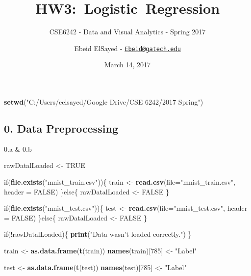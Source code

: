 \documentclass[]{article}
\title{HW3:~Logistic~Regression}
\subtitle{CSE6242 - Data and Visual Analytics - Spring 2017}
\author{Ebeid ElSayed -
\href{mailto:Ebeid@gatech.edu}{\nolinkurl{Ebeid@gatech.edu}}}
\date{March 14, 2017}
\newenvironment{Shaded}{\begin{snugshade}}{\end{snugshade}}
\newcommand{\KeywordTok}[1]{\textcolor[rgb]{0.13,0.29,0.53}{\textbf{{#1}}}}
\newcommand{\DataTypeTok}[1]{\textcolor[rgb]{0.13,0.29,0.53}{{#1}}}
\newcommand{\DecValTok}[1]{\textcolor[rgb]{0.00,0.00,0.81}{{#1}}}
\newcommand{\StringTok}[1]{\textcolor[rgb]{0.31,0.60,0.02}{{#1}}}
\newcommand{\OtherTok}[1]{\textcolor[rgb]{0.56,0.35,0.01}{{#1}}}
\newcommand{\NormalTok}[1]{{#1}}
\begin{document}
\maketitle

\begin{Shaded}
\begin{Highlighting}[]
\KeywordTok{setwd}\NormalTok{(}\StringTok{"C:/Users/eelsayed/Google Drive/CSE 6242/2017 Spring"}\NormalTok{)}
\end{Highlighting}
\end{Shaded}

\subsection{0. Data Preprocessing}\label{data-preprocessing}

0.a \& 0.b

\begin{Shaded}
\begin{Highlighting}[]
\NormalTok{rawDatalLoaded <-}\StringTok{ }\OtherTok{TRUE}

\NormalTok{if(}\KeywordTok{file.exists}\NormalTok{(}\StringTok{"mnist_train.csv"}\NormalTok{))\{}
  \NormalTok{train <-}\StringTok{ }\KeywordTok{read.csv}\NormalTok{(}\DataTypeTok{file=}\StringTok{"mnist_train.csv"}\NormalTok{, }\DataTypeTok{header =} \OtherTok{FALSE}\NormalTok{)}
\NormalTok{\}else\{}
  \NormalTok{rawDatalLoaded <-}\StringTok{ }\OtherTok{FALSE}
\NormalTok{\}}

\NormalTok{if(}\KeywordTok{file.exists}\NormalTok{(}\StringTok{"mnist_test.csv"}\NormalTok{))\{}
  \NormalTok{test <-}\StringTok{ }\KeywordTok{read.csv}\NormalTok{(}\DataTypeTok{file=}\StringTok{"mnist_test.csv"}\NormalTok{, }\DataTypeTok{header =} \OtherTok{FALSE}\NormalTok{)}
\NormalTok{\}else\{}
  \NormalTok{rawDatalLoaded <-}\StringTok{ }\OtherTok{FALSE}
\NormalTok{\}}

\NormalTok{if(!rawDatalLoaded)\{}
  \KeywordTok{print}\NormalTok{(}\StringTok{"Data wasn't loaded correctly."}\NormalTok{)}
\NormalTok{\}}

\NormalTok{train <-}\StringTok{ }\KeywordTok{as.data.frame}\NormalTok{(}\KeywordTok{t}\NormalTok{(train))}
\KeywordTok{names}\NormalTok{(train)[}\DecValTok{785}\NormalTok{] <-}\StringTok{ "Label"}

\NormalTok{test <-}\StringTok{ }\KeywordTok{as.data.frame}\NormalTok{(}\KeywordTok{t}\NormalTok{(test))}
\KeywordTok{names}\NormalTok{(test)[}\DecValTok{785}\NormalTok{] <-}\StringTok{ "Label"}
\end{Highlighting}
\end{Shaded}
\end{document}
